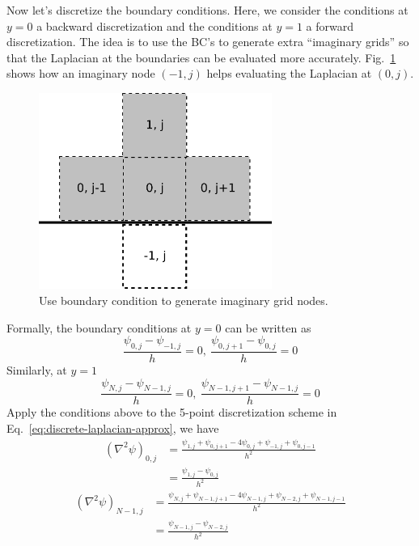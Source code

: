 \documentclass[onecolumn,aps, pre,amsmath,amssymb,longbibliography,11pt]{revtex4-2}
\begin{document}
Now let's discretize the boundary conditions. Here, we consider the conditions at $y=0$ a backward discretization and the conditions at $y=1$ a forward discretization. The idea is to use the BC's to generate extra ``imaginary grids'' so that the Laplacian at the boundaries can be evaluated more accurately. Fig.~\ref{fig:im-grid} shows how an imaginary node $(-1, j)$ helps evaluating the Laplacian at $(0, j)$.
%
\begin{figure}[h]
\begin{center}
\includegraphics[width=3in]{Figures/imaginary-grid.png}
\caption[Imaginary-grid]
{
Use boundary condition to generate imaginary grid nodes.
}
\label{fig:im-grid}
\end{center}
\end{figure}
%
Formally, the boundary conditions at $y=0$ can be written as
$$
\frac{\psi_{0, j}-\psi_{-1, j}}{h} = 0, \ \frac{\psi_{0, j+1}-\psi_{0, j}}{h} = 0
$$
Similarly, at $y=1$
$$
\frac{\psi_{N, j}-\psi_{N-1, j}}{h} = 0, \ \frac{\psi_{N-1, j+1}-\psi_{N-1, j}}{h} = 0
$$
%
Apply the conditions above to the 5-point discretization scheme in Eq.~\ref{eq:discrete-laplacian-approx}, we have
%
\begin{equation}\label{eq:discrete-bc-y0} %
\begin{split}
(\nabla^2\psi)_{0, j} & = \frac{\psi_{1, j} + \psi_{0, j+1} - 4\psi_{0, j} + \psi_{-1, j} + \psi_{0, j-1}}{h^2} \\
  & = \frac{\psi_{1, j} - \psi_{0, j}}{h^2}
\end{split}
\end{equation}
%
\begin{equation}\label{eq:discrete-bc-y1} %
\begin{split}
(\nabla^2\psi)_{N-1, j} & = \frac{\psi_{N, j} + \psi_{N-1, j+1} - 4\psi_{N-1, j} + \psi_{N-2, j} + \psi_{N-1, j-1}}{h^2} \\
  & = \frac{\psi_{N-1, j} - \psi_{N-2, j}}{h^2}
\end{split}
\end{equation}
\end{document}
